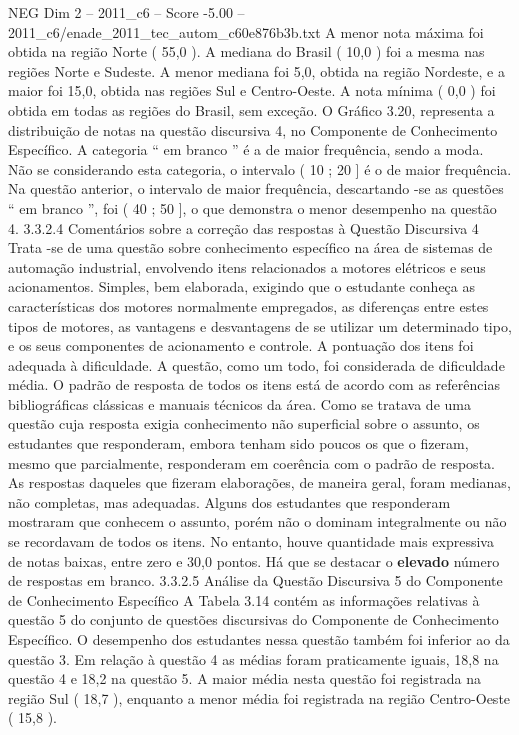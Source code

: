 \begin{textsample}{NEG Dim 2 – 2011\_c6 – Score -5.00 – 2011\_c6/enade\_2011\_tec\_autom\_c60e876b3b.txt}
A menor nota máxima foi obtida na região Norte ( 55,0 ).
A mediana do Brasil ( 10,0 ) foi a mesma nas regiões Norte e Sudeste.
A menor mediana foi 5,0, obtida na região Nordeste, e a maior foi 15,0, obtida nas regiões Sul e Centro-Oeste.
A nota mínima ( 0,0 ) foi obtida em todas as regiões do Brasil, sem exceção.
O Gráfico 3.20, representa a distribuição de notas na questão discursiva 4, no Componente de Conhecimento Específico.
A categoria “ em branco ” é a de maior frequência, sendo a moda.
Não se considerando esta categoria, o intervalo ( 10 ; 20 ] é o de maior frequência.
Na questão anterior, o intervalo de maior frequência, descartando -se as questões “ em branco ”, foi ( 40 ; 50 ], o que demonstra o menor desempenho na questão 4. 3.3.2.4 Comentários sobre a correção das respostas à Questão Discursiva 4 Trata -se de uma questão sobre conhecimento específico na área de sistemas de automação industrial, envolvendo itens relacionados a motores elétricos e seus acionamentos.
Simples, bem elaborada, exigindo que o estudante conheça as características dos motores normalmente empregados, as diferenças entre estes tipos de motores, as vantagens e desvantagens de se utilizar um determinado tipo, e os seus componentes de acionamento e controle.
A pontuação dos itens foi adequada à dificuldade.
A questão, como um todo, foi considerada de dificuldade média.
O padrão de resposta de todos os itens está de acordo com as referências bibliográficas clássicas e manuais técnicos da área.
Como se tratava de uma questão cuja resposta exigia conhecimento não superficial sobre o assunto, os estudantes que responderam, embora tenham sido poucos os que o fizeram, mesmo que parcialmente, responderam em coerência com o padrão de resposta.
As respostas daqueles que fizeram elaborações, de maneira geral, foram medianas, não completas, mas adequadas.
Alguns dos estudantes que responderam mostraram que conhecem o assunto, porém não o dominam integralmente ou não se recordavam de todos os itens.
No entanto, houve quantidade mais expressiva de notas baixas, entre zero e 30,0 pontos.
Há que se destacar o \textbf{elevado} número de respostas em branco. 3.3.2.5 Análise da Questão Discursiva 5 do Componente de Conhecimento Específico A Tabela 3.14 contém as informações relativas à questão 5 do conjunto de questões discursivas do Componente de Conhecimento Específico.
O desempenho dos estudantes nessa questão também foi inferior ao da questão 3.
Em relação à questão 4 as médias foram praticamente iguais, 18,8 na questão 4 e 18,2 na questão 5.
A maior média nesta questão foi registrada na região Sul ( 18,7 ), enquanto a menor média foi registrada na região Centro-Oeste ( 15,8 ).

\end{textsample}

